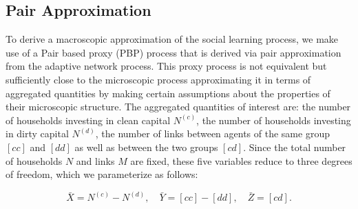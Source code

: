 \subsection{Pair Approximation}
\label{sec:pair_approximation}
To derive a macroscopic approximation of the social learning process, we make use of a Pair based proxy (PBP) process that is derived via pair approximation from the adaptive network process. This proxy process is not equivalent but sufficiently close to the microscopic process approximating it in terms of aggregated quantities by making certain assumptions about the properties of their microscopic structure. The aggregated quantities of interest are: the number of households investing in clean capital $N^{(c)}$, the number of households investing in dirty capital $N^{(d)}$, the number of links between agents of the same group $[cc]$ and $[dd]$ as well as between the two groups $[cd]$. Since the total number of households $N$ and links $M$ are fixed, these five variables reduce to three degrees of freedom, which we parameterize as follows:

\begin{equation}
	\bar{X} = N^{(c)} - N^{(d)}, \quad \bar{Y} = [cc] - [dd], \quad \bar{Z} = [cd].
	\label{eq:opinion_formation_macro_variables}
\end{equation}

